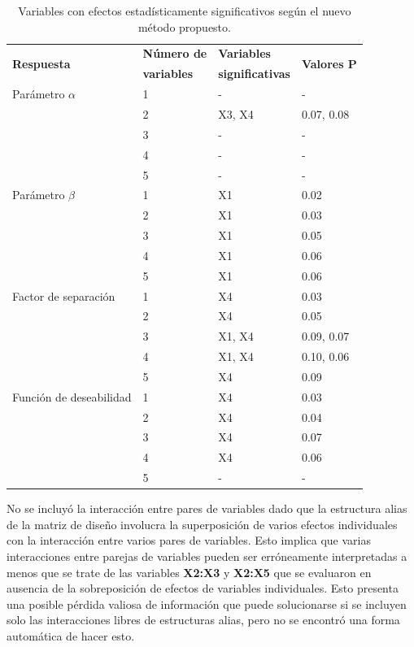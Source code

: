 \begin{table}[H]
    \centering\footnotesize
    \begin{tabular}{@{}llll@{}}\toprule
        \multirow{2}{*}{\textbf{Respuesta}} & \textbf{Número de} & \textbf{Variables} & \multirow{2}{*}{\textbf{Valores P}} \\
        &\textbf{variables} &\textbf{significativas}\\\midrule
        Parámetro $\alpha$ & 1 & - & -\\
                           & 2 & X3, X4 & 0.07, 0.08\\
                           & 3 & - & -\\
                           & 4 & - & - \\
                           & 5 & - & - \\\midrule
        Parámetro $\beta$  & 1 & X1 & 0.02\\
                           & 2 & X1 & 0.03\\
                           & 3 & X1 & 0.05\\
                           & 4 & X1 & 0.06\\
                           & 5 & X1 & 0.06 \\\midrule
        Factor de separación & 1 & X4 & 0.03\\
                             & 2 & X4 & 0.05\\
                             & 3 & X1, X4 & 0.09, 0.07\\
                             & 4 & X1, X4 & 0.10, 0.06\\
                             & 5 & X4 & 0.09\\\midrule
        Función de deseabilidad & 1 & X4 & 0.03\\
                                & 2 & X4 & 0.04\\
                                & 3 & X4 & 0.07\\
                                & 4 & X4 & 0.06\\
                                & 5 & - & - \\\bottomrule
    \end{tabular}
    \caption[Variables con efectos estadísticamente significativos.]{Variables con efectos estadísticamente significativos según el nuevo método propuesto.}
    \label{tab:paredesFrF2-2}
\end{table}
No se incluyó la interacción entre pares de variables dado que la estructura alias de la matriz de diseño involucra la superposición de varios efectos individuales con la interacción entre varios pares de variables. Esto implica que varias interacciones entre parejas de variables pueden ser erróneamente interpretadas a menos que se trate de las variables \textbf{X2:X3} y \textbf{X2:X5} que se evaluaron en ausencia de la sobreposición de efectos de variables individuales. Esto presenta una posible pérdida valiosa de información que puede solucionarse si se incluyen solo las interacciones libres de estructuras alias, pero no se encontró una forma automática de hacer esto.

